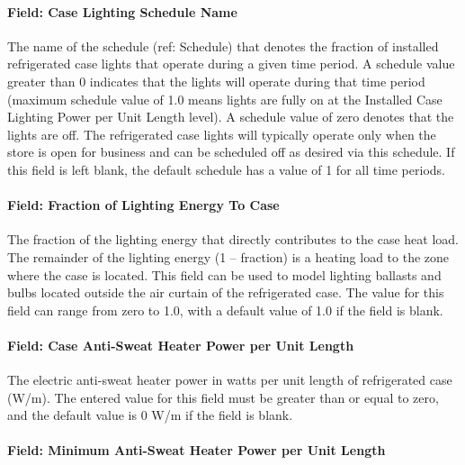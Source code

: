 \paragraph{Field: Case Lighting Schedule Name}\label{field-case-lighting-schedule-name}

The name of the schedule (ref: Schedule) that denotes the fraction of installed refrigerated case lights that operate during a given time period. A schedule value greater than 0 indicates that the lights will operate during that time period (maximum schedule value of 1.0 means lights are fully on at the Installed Case Lighting Power per Unit Length level). A schedule value of zero denotes that the lights are off. The refrigerated case lights will typically operate only when the store is open for business and can be scheduled off as desired via this schedule. If this field is left blank, the default schedule has a value of 1 for all time periods.

\paragraph{Field: Fraction of Lighting Energy To Case}\label{field-fraction-of-lighting-energy-to-case}

The fraction of the lighting energy that directly contributes to the case heat load. The remainder of the lighting energy (1 -- fraction) is a heating load to the zone where the case is located. This field can be used to model lighting ballasts and bulbs located outside the air curtain of the refrigerated case. The value for this field can range from zero to 1.0, with a default value of 1.0 if the field is blank.

\paragraph{Field: Case Anti-Sweat Heater Power per Unit Length}\label{field-case-anti-sweat-heater-power-per-unit-length}

The electric anti-sweat heater power in watts per unit length of refrigerated case (W/m). The entered value for this field must be greater than or equal to zero, and the default value is 0 W/m if the field is blank.

\paragraph{Field: Minimum Anti-Sweat Heater Power per Unit Length}\label{field-minimum-anti-sweat-heater-power-per-unit-length}

